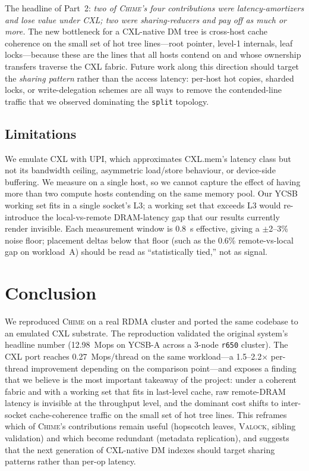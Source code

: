 \documentclass[11pt]{article}
\begin{document}
The headline of Part~2: \emph{two of \textsc{Chime}'s four contributions were latency-amortizers and lose value under CXL; two were sharing-reducers and pay off as much or more.} The new bottleneck for a CXL-native DM tree is cross-host cache coherence on the small set of hot tree lines---root pointer, level-1 internals, leaf locks---because these are the lines that all hosts contend on and whose ownership transfers traverse the CXL fabric. Future work along this direction should target the \emph{sharing pattern} rather than the access latency: per-host hot copies, sharded locks, or write-delegation schemes are all ways to remove the contended-line traffic that we observed dominating the \texttt{split} topology.

\subsection{Limitations}
We emulate CXL with UPI, which approximates CXL.mem's latency class but not its bandwidth ceiling, asymmetric load/store behaviour, or device-side buffering. We measure on a single host, so we cannot capture the effect of having more than two compute hosts contending on the same memory pool. Our YCSB working set fits in a single socket's L3; a working set that exceeds L3 would re-introduce the local-vs-remote DRAM-latency gap that our results currently render invisible. Each measurement window is 0.8~s effective, giving a $\pm$2--3\% noise floor; placement deltas below that floor (such as the 0.6\% remote-vs-local gap on workload~A) should be read as ``statistically tied,'' not as signal.

\section{Conclusion}
We reproduced \textsc{Chime} on a real RDMA cluster and ported the same codebase to an emulated CXL substrate. The reproduction validated the original system's headline number (12.98~Mops on YCSB-A across a 3-node \texttt{r650} cluster). The CXL port reaches 0.27~Mops/thread on the same workload---a 1.5--2.2$\times$ per-thread improvement depending on the comparison point---and exposes a finding that we believe is the most important takeaway of the project: under a coherent fabric and with a working set that fits in last-level cache, raw remote-DRAM latency is invisible at the throughput level, and the dominant cost shifts to inter-socket cache-coherence traffic on the small set of hot tree lines. This reframes which of \textsc{Chime}'s contributions remain useful (hopscotch leaves, \textsc{Valock}, sibling validation) and which become redundant (metadata replication), and suggests that the next generation of CXL-native DM indexes should target sharing patterns rather than per-op latency.
\end{document}
